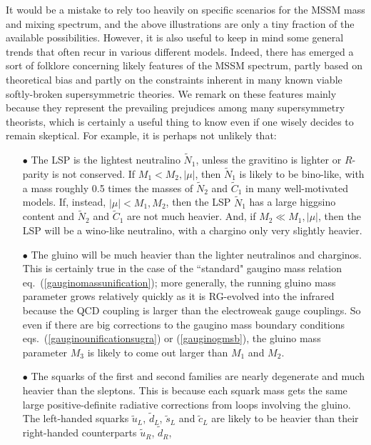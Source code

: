 \documentclass[12pt]{article}
\def\stilde{\widetilde}
\begin{document}
It would be a mistake to rely too heavily on specific scenarios for the 
MSSM mass and mixing spectrum, and the above illustrations are only
a tiny fraction of the available possibilities. However, it is also 
useful to keep in mind some general trends that often recur in various 
different models. Indeed, there has emerged a sort of folklore 
concerning likely features of the MSSM spectrum, partly based on 
theoretical bias and partly on the constraints inherent in many known viable 
softly-broken supersymmetric theories. We remark on these features mainly 
because they represent the prevailing prejudices among many supersymmetry 
theorists, which is certainly a useful thing to know even if one wisely 
decides to remain skeptical. For example, it is perhaps not unlikely that:
%
\begin{itemize}
%
\item[$\bullet$] The LSP is the lightest neutralino $\stilde N_1$, unless 
the gravitino is lighter or $R$-parity is not conserved. If $M_1 <  
M_2,|\mu|$, then $\stilde N_1$ is likely to be bino-like, with a mass 
roughly 
0.5 times the masses of $\stilde N_2$ and $\stilde C_1$ in many
well-motivated models. If, instead, 
$|\mu| < M_1,M_2$, then the LSP $\stilde N_1$ 
has a large higgsino content and 
$\stilde N_2$ and $\stilde C_1$ are not much heavier.
And, if $M_2 \ll M_1, |\mu|$, then the LSP will be a wino-like
neutralino, with a chargino only very slightly heavier.
%
\item[$\bullet$] The gluino will be much heavier than the lighter 
neutralinos and charginos. This is certainly true in the case of the 
``standard" gaugino mass relation eq.~(\ref{gauginomassunification}); more 
generally, the running gluino mass parameter grows relatively quickly as 
it is RG-evolved into the infrared because the QCD coupling is larger than 
the electroweak gauge couplings. So even if there are big corrections to 
the gaugino mass boundary conditions eqs.~(\ref{gauginounificationsugra}) 
or (\ref{gauginogmsb}), the gluino mass parameter $M_3$ is likely to come 
out larger than $M_1$ and $M_2$.
%
\item[$\bullet$] The squarks of the first and second families are nearly 
degenerate and much heavier than the sleptons. This is because each squark 
mass gets the same large positive-definite radiative corrections from 
loops involving the gluino. The left-handed squarks $\stilde u_L$, 
$\stilde d_L$, $\stilde s_L$ and $\stilde c_L$ are likely to be heavier 
than their right-handed counterparts $\stilde u_R$, $\stilde d_R$, 

\end{itemize}
\end{document}
